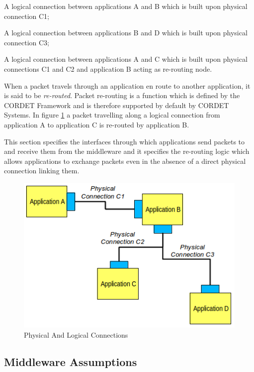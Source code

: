 \documentclass[a4paper,10pt]{article}
\newenvironment{fw_enumerate}					%
{\begin{enumerate}
  \setlength{\itemsep}{1mm}
  \setlength{\parskip}{0pt}
  \setlength{\parsep}{0pt}}
{\end{enumerate}}
\begin{document}
\begin{fw_enumerate}
\item A logical connection between applications A and B which is built upon physical connection C1;
\item A logical connection between applications B and D which is built upon physical connection C3;
\item A logical connection between applications A and C which is built upon physical connections C1 and C2 and application B acting as re-routing node.
\end{fw_enumerate}

When a packet travels through an application en route to another application, it is said to be \textit{re-routed}. Packet re-routing is a function which is defined by the CORDET Framework and is therefore supported by default by CORDET Systems. In figure \ref{fig:PhysicalAndLogicalConnections} a packet travelling along a logical connection from application A to application C is re-routed by application B.

This section specifies the interfaces through which applications send packets to and receive them from the middleware and it specifies the re-routing logic which allows applications to exchange packets even in the absence of a direct physical connection linking them. 

\begin{figure}[ht]
 \centering
 \includegraphics[scale=0.45,keepaspectratio=true]{PhysicalAndLogicalConnections.png}
 \caption{Physical And Logical Connections}
 \label{fig:PhysicalAndLogicalConnections}
\end{figure} 

\subsection{Middleware Assumptions}\label{sec:MwAssumptions}
 
\end{document}
